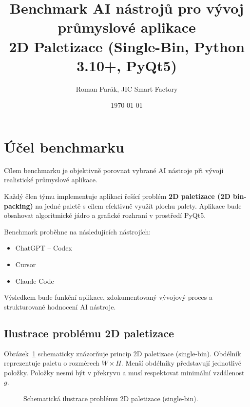 \documentclass[12pt,a4paper]{article}
\title{
\textbf{\Large Benchmark AI nástrojů pro vývoj průmyslové aplikace}\\
{\large 2D Paletizace (Single-Bin, Python 3.10+, PyQt5)}
}
\author{
Roman Parák, JIC Smart Factory
}
\date{\today
}
\begin{document}
\pagestyle{plain}

\maketitle

\section{Účel benchmarku}

Cílem benchmarku je objektivně porovnat vybrané AI nástroje při vývoji realistické průmyslové aplikace.

Každý člen týmu implementuje aplikaci řešící problém \textbf{2D paletizace (2D bin-packing)} na jedné paletě s cílem efektivně využít plochu palety. Aplikace bude obsahovat algoritmické jádro a grafické rozhraní v prostředí PyQt5.

Benchmark proběhne na následujících nástrojích:

\begin{itemize}
    \item ChatGPT -- Codex
    \item Cursor
    \item Claude Code
\end{itemize}

Výsledkem bude funkční aplikace, zdokumentovaný vývojový proces a strukturované hodnocení AI nástroje.

\subsection{Ilustrace problému 2D paletizace}

Obrázek~\ref{fig:binpacking_schema} schematicky znázorňuje princip
2D paletizace (single-bin). Obdélník reprezentuje paletu o rozměrech
$W \times H$. Menší obdélníky představují jednotlivé položky.
Položky nesmí být v překryvu a musí respektovat minimální
vzdálenost $g$.

\begin{figure}[H]
\centering
{}
\caption{Schematická ilustrace problému 2D paletizace (single-bin).}
\label{fig:binpacking_schema}
\end{figure}
\end{document}
